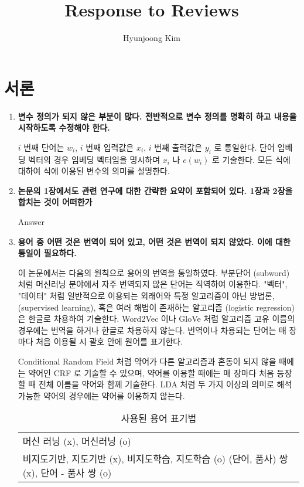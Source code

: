 \documentclass[11pt]{article}
\begin{document}
\title{Response to Reviews}
\author{Hyunjoong Kim}
\maketitle
\smallskip

\section{서론}
\begin{enumerate}
\item \textbf{변수 정의가 되지 않은 부분이 많다. 전반적으로 변수 정의를 명확히 하고 내용을 시작하도록 수정해야 한다.}

$i$ 번째 단어는 $w_i$, $i$ 번째 입력값은 $x_i$, $i$ 번째 출력값은 $y_i$ 로 통일한다. 단어 임베딩 벡터의 경우 임베딩 벡터임을 명시하며 $x_i$ 나 $e(w_i)$ 로 기술한다. 모든 식에 대하여 식에 이용된 변수의 의미를 설명한다.

\item \textbf{논문의 1장에서도 관련 연구에 대한 간략한 요약이 포함되어 있다. 1장과 2장을 합치는 것이 어떠한가}

Answer


\item \textbf{용어 중 어떤 것은 번역이 되어 있고, 어떤 것은 번역이 되지 않았다. 이에 대한 통일이 필요하다.}

이 논문에서는 다음의 원칙으로 용어의 번역을 통일하였다. 부분단어 (subword) 처럼 머신러닝 분야에서 자주 번역되지 않은 단어는 직역하여 이용한다. "벡터", "데이터" 처럼 일반적으로 이용되는 외래어와 특정 알고리즘이 아닌 방법론, (supervised learning), 혹은 여러 해법이 존재하는 알고리즘 (logistic regression) 은 한글로 차용하여 기술한다. Word2Vec 이나 GloVe 처럼 알고리즘 고유 이름의 경우에는 번역을 하거나 한글로 차용하지 않는다. 번역이나 차용되는 단어는 매 장마다 처음 이용될 시 괄호 안에 원어를 표기한다. 

Conditional Random Field 처럼 약어가 다른 알고리즘과 혼동이 되지 않을 때에는 약어인 CRF 로 기술할 수 있으며, 약어를 이용할 때에는 매 장마다 처음 등장할 때 전체 이름을 약어와 함께 기술한다. LDA 처럼 두 가지 이상의 의미로 해석 가능한 약어의 경우에는 약어를 이용하지 않는다.

\begin{table}[]
\centering
\begin{tabular}{l}
머신 러닝 (x), 머신러닝 (o) \\
비지도기반, 지도기반 (x), 비지도학습, 지도학습 (o)
(단어, 품사) 쌍 (x), 단어 - 품사 쌍 (o)
\end{tabular}
\caption{사용된 용어 표기법}
\label{tab:terminology}
\end{table}



\end{enumerate}
\end{document}
